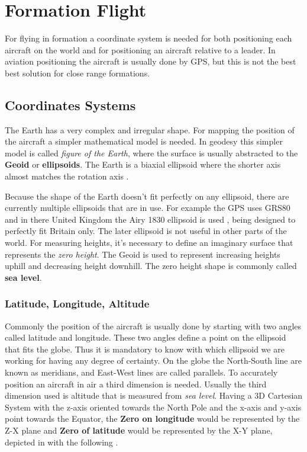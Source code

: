\chapter{Formation Flight}
\label{chapter:formation-flight}
For flying in formation a coordinate system is needed for both positioning each 
aircraft on the world and for positioning an aircraft relative to a leader. In
aviation positioning the aircraft is usually done by GPS, but this is not the best best solution for close range formations.

\section{Coordinates Systems}
\label{sec:coordinates-systems}
The Earth has a very complex and irregular shape. For mapping the position of
the aircraft a simpler mathematical model is needed. In geodesy this simpler
model is called \textit{figure of the Earth}, where the surface is usually
abstracted to the \textbf{Geoid} or \textbf{ellipsoids}. The Earth is a biaxial 
ellipsoid where the shorter axis almost matches the rotation axis \cite{gb-coordinates}.

Because the shape of the Earth doesn't fit perfectly on any ellipsoid, there
are currently multiple ellipsoids that are in use. For example the GPS uses
GRS80 \cite{gsr80} and in there
United Kingdom the Airy 1830 ellipsoid is used \cite{gb-coordinates},  being 
designed to perfectly fit Britain only. The later ellipsoid is not useful in 
other parts of the world. For measuring heights, it's necessary to define an
imaginary surface that represents the \textit{zero height}. The Geoid is used
to represent increasing heights uphill and decreasing height downhill. The
zero height shape is commonly called \textbf{sea level}.

\subsection{Latitude, Longitude,  Altitude}
\label{sub-sec:lla}
Commonly the position of the aircraft is usually done by starting with 
two angles called latitude and longitude. These two angles define a point
on the ellipsoid that fits the globe. Thus it is mandatory to know with which
ellipsoid we are working for having any degree of certainty. On the globe
the North-South line are known as meridians,  and East-West lines are called 
parallels. To accurately position an aircraft in air a third dimension is needed.
Usually the third dimension used is altitude that is measured from \textit{sea level}.
Having a 3D Cartesian System with the z-axis oriented towards the North Pole and
the x-axis and y-axis point towards the Equator, the \textbf{Zero on longitude}
would be represented by the Z-X plane and \textbf{Zero of latitude} would be 
represented by the X-Y plane, depicted in \cite{gb-coordinates} with the following
.
% 
\newpage

